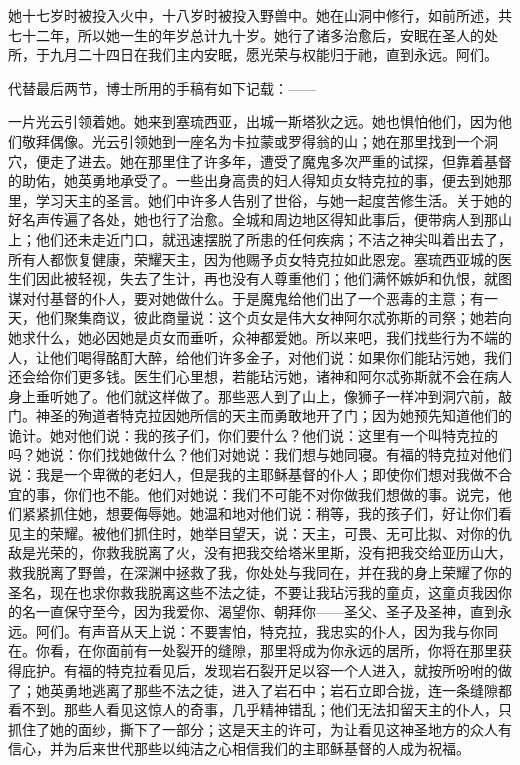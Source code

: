 她十七岁时被投入火中，十八岁时被投入野兽中。她在山洞中修行，如前所述，共七十二年，所以她一生的年岁总计九十岁。她行了诸多治愈后，安眠在圣人的处所，于九月二十四日在我们主内安眠，愿光荣与权能归于祂，直到永远。阿们。\par

代替最后两节，博士所用的手稿有如下记载：——\par

一片光云引领着她。她来到塞琉西亚，出城一斯塔狄之远。她也惧怕他们，因为他们敬拜偶像。光云引领她到一座名为卡拉蒙或罗得翁的山；她在那里找到一个洞穴，便走了进去。她在那里住了许多年，遭受了魔鬼多次严重的试探，但靠着基督的助佑，她英勇地承受了。一些出身高贵的妇人得知贞女特克拉的事，便去到她那里，学习天主的圣言。她们中许多人告别了世俗，与她一起度苦修生活。关于她的好名声传遍了各处，她也行了治愈。全城和周边地区得知此事后，便带病人到那山上；他们还未走近门口，就迅速摆脱了所患的任何疾病；不洁之神尖叫着出去了，所有人都恢复健康，荣耀天主，因为他赐予贞女特克拉如此恩宠。塞琉西亚城的医生们因此被轻视，失去了生计，再也没有人尊重他们；他们满怀嫉妒和仇恨，就图谋对付基督的仆人，要对她做什么。于是魔鬼给他们出了一个恶毒的主意；有一天，他们聚集商议，彼此商量说：这个贞女是伟大女神阿尔忒弥斯的司祭；她若向她求什么，她必因她是贞女而垂听，众神都爱她。所以来吧，我们找些行为不端的人，让他们喝得酩酊大醉，给他们许多金子，对他们说：如果你们能玷污她，我们还会给你们更多钱。医生们心里想，若能玷污她，诸神和阿尔忒弥斯就不会在病人身上垂听她了。他们就这样做了。那些恶人到了山上，像狮子一样冲到洞穴前，敲门。神圣的殉道者特克拉因她所信的天主而勇敢地开了门；因为她预先知道他们的诡计。她对他们说：我的孩子们，你们要什么？他们说：这里有一个叫特克拉的吗？她说：你们找她做什么？他们对她说：我们想与她同寝。有福的特克拉对他们说：我是一个卑微的老妇人，但是我的主耶稣基督的仆人；即使你们想对我做不合宜的事，你们也不能。他们对她说：我们不可能不对你做我们想做的事。说完，他们紧紧抓住她，想要侮辱她。她温和地对他们说：稍等，我的孩子们，好让你们看见主的荣耀。被他们抓住时，她举目望天，说：天主，可畏、无可比拟、对你的仇敌是光荣的，你救我脱离了火，没有把我交给塔米里斯，没有把我交给亚历山大，救我脱离了野兽，在深渊中拯救了我，你处处与我同在，并在我的身上荣耀了你的圣名，现在也求你救我脱离这些不法之徒，不要让我玷污我的童贞，这童贞我因你的名一直保守至今，因为我爱你、渴望你、朝拜你——圣父、圣子及圣神，直到永远。阿们。有声音从天上说：不要害怕，特克拉，我忠实的仆人，因为我与你同在。你看，在你面前有一处裂开的缝隙，那里将成为你永远的居所，你将在那里获得庇护。有福的特克拉看见后，发现岩石裂开足以容一个人进入，就按所吩咐的做了；她英勇地逃离了那些不法之徒，进入了岩石中；岩石立即合拢，连一条缝隙都看不到。那些人看见这惊人的奇事，几乎精神错乱；他们无法扣留天主的仆人，只抓住了她的面纱，撕下了一部分；这是天主的许可，为让看见这神圣地方的众人有信心，并为后来世代那些以纯洁之心相信我们的主耶稣基督的人成为祝福。\par

